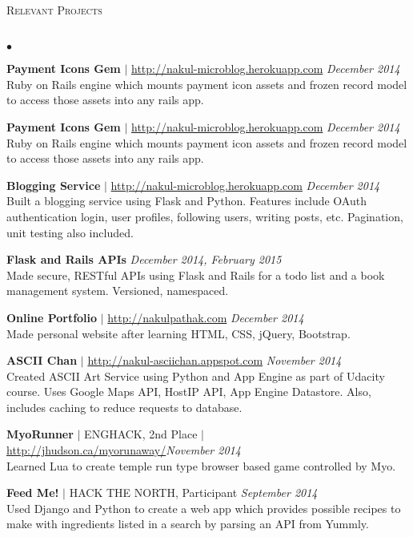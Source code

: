 \documentclass[10pt]{article}
\newcommand{\lineunder}{\vspace*{-8pt} \\ \hspace*{-18pt} \hrulefill \\}
\newcommand{\header}[1]{{\hspace*{-15pt}\vspace*{6pt} \textsc{#1}} \vspace*{-6pt} \lineunder}
\newenvironment{achievements}{\begin{list}{$\bullet$}{\topsep 0pt \itemsep -1.5pt \leftmargin 5pt}}{\vspace*{4pt}\end{list}}
\begin{document}
\vspace{5pt}

\header{\normalsize Relevant Projects}
\begin{achievements}
\def\UrlFont{\em}
\item \textbf{Payment Icons Gem} $|$ \url{http://nakul-microblog.herokuapp.com} \hfill \textit {December 2014}
\\ Ruby on Rails engine which mounts payment icon assets and frozen record model to access those assets into any rails app.
\item \textbf{Payment Icons Gem} $|$ \url{http://nakul-microblog.herokuapp.com} \hfill \textit {December 2014}
\\ Ruby on Rails engine which mounts payment icon assets and frozen record model to access those assets into any rails app.
\item \textbf{Blogging Service} $|$ \url{http://nakul-microblog.herokuapp.com} \hfill \textit {December 2014}
\\ Built a blogging service using Flask and Python. Features include OAuth authentication login, user profiles, following users, writing posts, etc. Pagination, unit testing also included.
\item \textbf{Flask and Rails APIs}  \hfill \textit {December 2014, February 2015}
\\ Made secure, RESTful APIs using Flask and Rails for a todo list and a book management system. Versioned, namespaced.
\item \textbf{Online Portfolio} $|$  \url{http://nakulpathak.com} \hfill \textit {December 2014}
\\ Made personal website after learning HTML, CSS, jQuery, Bootstrap.
\item \textbf{ASCII Chan}  $|$ \url{http://nakul-asciichan.appspot.com} \hfill \textit {November 2014}
\\ Created ASCII Art Service using Python and App Engine as part of Udacity course. Uses Google Maps API, HostIP API, App Engine Datastore. Also, includes caching to reduce requests to database. 
\item\textbf{MyoRunner}  {$|$ \scriptsize ENGHACK, 2nd Place $|$ }  \url{http://jhudson.ca/myorunaway/}\hfill \textit {November 2014}
\\ Learned Lua to create temple run type browser based game controlled by Myo.
\item \textbf{Feed Me!} {$|$ \scriptsize HACK THE NORTH, Participant}  \hfill \textit {September 2014}
\\ Used Django and Python to create a web app which provides possible recipes to make with ingredients listed in a search by parsing an API from Yummly.
\end{achievements}
\end{document}
